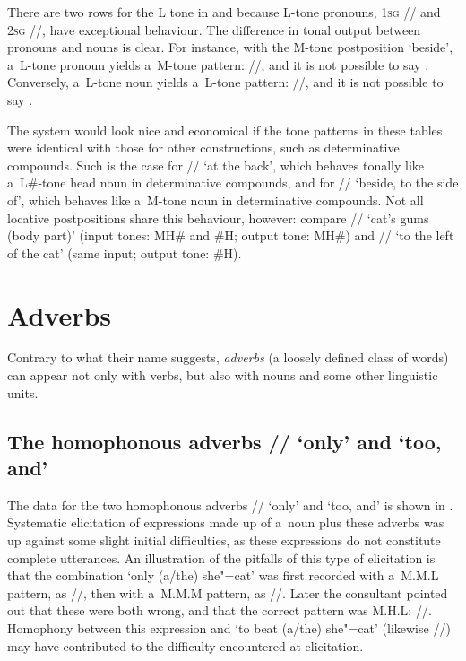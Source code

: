 There are two rows for the L tone in  and  because L-tone pronouns, 1\textsc{sg} //
and 2\textsc{sg} //, have exceptional behaviour. The difference in tonal output between pronouns and nouns is clear. For instance, with the
M-tone postposition ‘beside’, a~L-tone pronoun yields a~M-tone pattern: //, and it
is not possible to say . Conversely, a~L-tone noun yields a~L-tone pattern:
//, and it is not possible to say .

The system would look nice and economical if the tone patterns in these tables were identical with those for
other constructions, such as determinative compounds. Such is the case for // ‘at the
back’, which behaves tonally like a~L\#-tone head noun in determinative compounds, and for
// ‘beside, to the side of’, which behaves like a~M-tone noun in determinative compounds. Not all locative
postpositions share this behaviour, however: compare // ‘cat’s gums (body
part)’ (input tones: MH\# and \#H; output tone: MH\#) and // ‘to the left of
the cat’ (same input; output tone: \#H).

\largerpage
\section{Adverbs}
\label{sec:adverbs}

Contrary to what their name suggests, \textit{adverbs} (a loosely defined class of words) can appear not only with verbs, but also with nouns and some other linguistic units. 

\subsection{The homophonous adverbs // ‘only’ and ‘too, and’}
\label{sec:onlyand}

The data for the two homophonous adverbs // ‘only’ and ‘too, and’ is shown in . Systematic elicitation of expressions made up of a~noun plus these adverbs was up against some slight initial difficulties, as these expressions do not constitute complete utterances. An illustration of the pitfalls of this type of elicitation is that the combination ‘only \mbox{(a/the)} she"=cat' was first recorded with a~M.M.L pattern, as //, then with a~M.M.M pattern, as //. Later the consultant pointed out that these were both wrong, and that the correct pattern was M.H.L: //. Homophony between this expression and ‘to beat \mbox{(a/the)} she"=cat' (likewise //) may have contributed to the difficulty encountered at elicitation.


